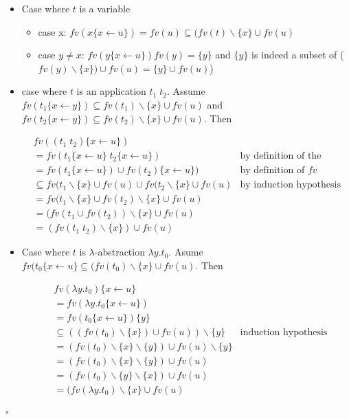 \documentclass{article}
\theoremstyle{plain}
\theoremstyle{plain}
\renewcommand\qedsymbol{$\square$}
\begin{document}
  \begin{itemize}
    \item Case where $t$ is a variable
      \begin{itemize}
        \item case x: $fv(x\{x\leftarrow u\}) = fv(u) \subseteq (fv(t)
          \backslash \{x\} \cup fv(u)$
        \item case $y\not =x$: $fv(y\{x\leftarrow u\} ) fv(y) = \{y\}$ and
          $\{y\}$ is indeed a subset of ($fv(y)\backslash \{x\}) \cup fv(u) =
          \{y\} \cup fv(u)$)
      \end{itemize}

    \item case where $t$ is an application $t_1\;t_2$. Assume
      $fv(t_1\{x\leftarrow y\})\subseteq fv(t_1) \backslash \{x\} \cup fv(u)$ and
      $fv(t_2\{x\leftarrow y\})\subseteq fv(t_2) \backslash \{x\} \cup fv(u)$.
      Then

      \begin{align*}
        &fv((t_1\;t_2)\{x \leftarrow u\}) \\
        &= fv(t_1\{x \leftarrow u\}\; t_2\{x \leftarrow u\}) & \text{by
        definition of the substitution} \\
        &= fv(t_1\{x \leftarrow u\}) \cup fv(t_2)\{x \leftarrow u\}) & \text{by
        definition of $fv$} \\
        &\subseteq fv(t_1 \backslash \{x\} \cup fv(u) \cup
        fv(t_2 \backslash \{x\} \cup fv(u) & \text{by induction hypothesis} \\
        &=fv(t_1 \backslash \{x\} \cup fv(t_2) \backslash \{x\}
        \cup fv(u) \\
        &=(fv(t_1 \cup fv(t_2)) \backslash \{x\}
        \cup fv(u) \\
        &= (fv(t_1\;t_2) \backslash \{x\}) \cup fv(u)
      \end{align*}

    \item Case where $t$ is $\lambda$-abstraction $\lambda y.t_0$. Asume
      $fv(t_0\{x\leftarrow u\} \subseteq (fv(t_0) \backslash \{x\} \cup fv(u)$.
      Then

      \begin{align*}
        &fv(\lambda y.t_0)\{x \leftarrow u\} \\
        &= fv(\lambda y.t_0\{x \leftarrow u\}) \\
        &= fv(t_0\{x \leftarrow u\})\{y\} \\
        &\subseteq ((fv(t_0) \backslash\{x\})\cup fv(u))\backslash \{y\} &
        \text{induction hypothesis} \\
        &= (fv(t_0) \backslash\{x\} \backslash \{y\})\cup fv(u)\backslash \{y\}
        \\
        &= (fv(t_0) \backslash\{x\} \backslash \{y\})\cup fv(u) \\
        &= (fv(t_0) \backslash \{y\} \backslash\{x\})\cup fv(u) \\
        &= (fv(\lambda y.t_0) \backslash \{x\} \cup fv(u) \\
      \end{align*}
  \end{itemize}
  \qedsymbol
\end{document}
